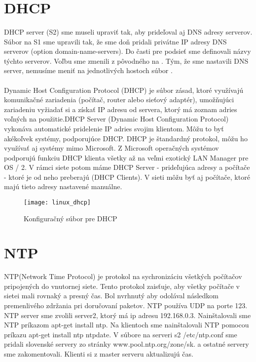 \section{DHCP}
\paragraph{}
DHCP server (S2) sme museli upraviť tak, aby prideľoval aj DNS adresy serverov. Súbor  na S1 sme upravili tak, že sme doň pridali privátne IP adresy DNS serverov (option domain-name-servers). Do časti pre podsieť sme definovali názvy týchto serverov. Voľbu  sme zmenili z pôvodného  na . Tým, že sme nastavili DNS server, nemusíme meniť na jednotlivých hostoch súbor .
\paragraph{}
Dynamic Host Configuration Protocol (DHCP) je súbor zásad, ktoré využívajú komunikačné zariadenia (počítač, router alebo sieťový adaptér), umožňujúci zariadeniu vyžiadať si a získať IP adresu od servera, ktorý má zoznam adries voľných na použitie.DHCP Server (Dynamic Host Configuration Protocol) vykonáva automatické pridelenie IP adries svojim klientom. Môžu to byť akékoľvek systémy, podporujúce DHCP. DHCP je štandardný protokol, môžu ho využívať aj systémy mimo Microsoft. Z Microsoft operačných systémov podporujú funkciu DHCP klienta všetky až na veľmi exotický LAN Manager pre OS / 2. V rámci siete potom máme DHCP Server - prideľujúca adresy a počítače - ktoré je od neho preberajú (DHCP Clients). V sieti môžu byť aj počítače, ktoré majú tieto adresy nastavené manuálne.

\begin{figure}[!htb]
\centering
\texttt{[image: linux\_dhcp]}
\caption{Konfiguračný súbor pre DHCP}
\label{fig:x dhcp_config}
\end{figure}

\section{NTP}
\paragraph{}
NTP(Network Time Protocol) je protokol na sychronizáciu všetkých počítačov pripojených do vnutornej siete. Tento protokol zaisťuje, aby všetky počítače v sietei mali rovnaký a presný čas. Bol nvrhnutý aby odolával následkom premenlivého zdržania pri doručovaní paketov. NTP používa UDP na porte 123. NTP server sme zvolili server2, ktorý má ip adresu 192.168.0.3. Nainštalovali sme NTP príkazom apt-get install ntp. Na klientoch sme nainštalovali NTP pomocou príkazu apt-get install ntp ntpdate. V súbore na serveri s2 /etc/ntp.conf sme pridali slovenské servery zo stránky www.pool.ntp.org/zone/sk. a ostatné servery sme zakomentovali. Klienti si z master serveru aktualizujú čas.

